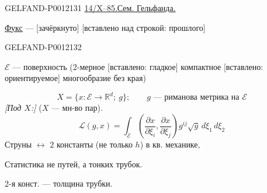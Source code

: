 \begin{GelfandAdjacentEvidence}{GELFAND-P001213}{1}
\underline{14/X--85.}\qquad \underline{Сем. Гельфанда.}

\underline{\underline{Фукс}} ---  [зачёркнуто]
[вставлено над строкой: прошлого] 
\end{GelfandAdjacentEvidence}
\begin{GelfandAdjacentEvidence}{GELFAND-P001213}{2}


\(\mathcal E\) --- поверхность
(2-мерное [вставлено: гладкое] компактное [вставлено: ориентируемое] многообразие без края)
\end{GelfandAdjacentEvidence}


\[
X=\{x:\mathcal E\to\mathbb R^d;\ g\};
\qquad g\text{ --- риманова метрика на }\mathcal E
\]
\textit{[Под \(X\):]} (\(X\) --- мн-во пар).
\begin{equation*}
\mathcal L(g,x)=\int_{\mathcal E}
\left(\frac{\partial x}{\partial\xi_i},\frac{\partial x}{\partial\xi_j}\right)
g^{ij}\sqrt g\,d\xi_1\,d\xi_2\tag{1}
\end{equation*}
 Струны \(\leftrightarrow\) 2 константы (\(\text{не только }h\)) в кв. механике,

Статистика не путей, а тонких трубок.

2-я конст. --- толщина трубки.


